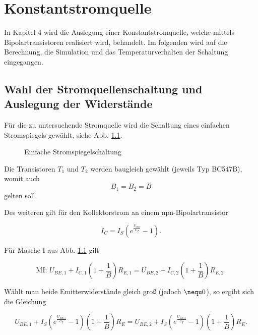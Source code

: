 \def\figpath{tex/4_Konstantstromquelle/pictures}
\graphicspath{{tex/4_Konstantstromquelle/pictures/}}

\chapter{Konstantstromquelle}
In Kapitel 4 wird die Auslegung einer Konstantstromquelle, welche mittels Bipolartransistoren realisiert wird, behandelt. Im folgenden wird auf die Berechnung, die Simulation und das Temperaturverhalten der Schaltung eingegangen. 

\section{Wahl der Stromquellenschaltung und Auslegung der Widerstände}
Für die zu untersuchende Stromquelle wird die Schaltung eines einfachen Stromspiegels gewählt, siehe Abb. \ref{fig_Kap4_01:Stromspiegel01}. 

\begin{figure}[H]
	\centering
	\def\svgwidth{0.5\textwidth}
	
	\caption{Einfache Stromspiegelschaltung} 
	\label{fig_Kap4_01:Stromspiegel01} 
\end{figure}

Die Transistoren $T_1$ und $T_2$ werden baugleich gewählt (jeweils Typ BC547B), womit auch 
\begin{equation}
    B_1 = B_2 = B
\end{equation}
gelten soll. 

Des weiteren gilt für den Kollektorstrom an einem npn-Bipolartransistor

\begin{equation}
    \label{glgn_transist}
    I_C = I_S \left(e^{\frac{U_{BE}}{U_T}} - 1 \right) .
\end{equation}

Für Masche I aus Abb. \ref{fig_Kap4_01:Stromspiegel01} gilt

\begin{equation}
    \text{MI: } U_{BE,1} + I_{C,1}\left( 1 + \frac{1}{B}\right)R_{E,1} = U_{BE,2} + I_{C,2}\left( 1 + \frac{1}{B}\right)R_{E,2} .
\end{equation}

Wählt man beide Emitterwiderstände gleich groß (jedoch $\nequ 0 $), so ergibt sich die Gleichung

\begin{equation}
    U_{BE,1} + I_S \left(e^{\frac{U_{BE,1}}{U_T}} - 1 \right)\left( 1 + \frac{1}{B}\right)R_E = U_{BE,2} + I_S \left(e^{\frac{U_{BE,2}}{U_T}} - 1 \right)\left( 1 + \frac{1}{B}\right)R_E .
    \label{glng_transzend}
\end{equation}

